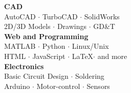
{\sc \textbf{CAD}}\\
AutoCAD  {\Large $\cdot$} TurboCAD {\Large $\cdot$} SolidWorks \\
2D/3D Models {\Large $\cdot$} Drawings {\Large $\cdot$} GD\&T \\

{\sc \textbf{Web and Programming}}\\
MATLAB {\Large $\cdot$} Python {\Large $\cdot$} Linux/Unix \\
HTML {\Large $\cdot$} JavaScript {\Large $\cdot$} \LaTeX {\Large $\cdot$} and more\\

{\sc \textbf{Electronics}}\\
Basic Circuit Design {\Large $\cdot$} Soldering \\
Arduino {\Large $\cdot$} Motor-control {\Large $\cdot$} Sensors \\


